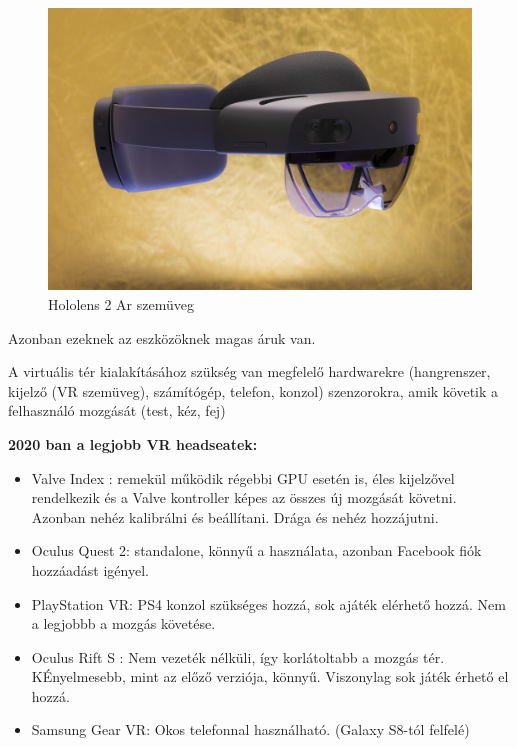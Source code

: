 \begin{figure}[htp]
    \centering
   	\includegraphics[width=5truecm, height=3.8truecm]{images/holo.jpg}
	\caption{Hololens 2 Ar szemüveg}
\end{figure}

Azonban ezeknek az eszközöknek magas áruk van. 


A virtuális tér kialakításához szükség van megfelelő hardwarekre (hangrenszer, kijelző (VR szemüveg), számítógép, telefon, konzol) szenzorokra, amik követik a felhasználó mozgását (test, kéz, fej)

{\bf 2020\- ban a legjobb VR headseatek:}
\begin{itemize}
\item Valve Index : remekül működik régebbi GPU esetén is, éles kijelzővel rendelkezik és a Valve kontroller képes az összes új mozgását követni. Azonban nehéz kalibrálni és beállítani. Drága és nehéz hozzájutni.
\item Oculus Quest 2: standalone, könnyű a használata, azonban Facebook fiók hozzáadást igényel.
\item PlayStation VR: PS4 konzol szükséges hozzá, sok ajáték elérhető hozzá. Nem a legjobbb a mozgás követése.
\item Oculus Rift S : Nem vezeték nélküli, így korlátoltabb a mozgás tér.  KÉnyelmesebb, mint az előző verziója, könnyű. Viszonylag sok játék érhető el hozzá.
\item Samsung Gear VR: Okos telefonnal használható. (Galaxy S8-tól felfelé)  
\end{itemize}

